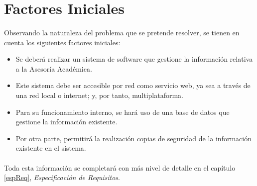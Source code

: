 \section{Factores Iniciales}

\paragraph{}Observando la naturaleza del problema que se pretende resolver, se
tienen en cuenta los siguientes factores iniciales:

\begin{itemize}
   \item Se deberá realizar un sistema de software que gestione la información
   relativa a la Asesoría Académica.
   \item Este sistema debe ser accesible por red como servicio web, ya sea a
   través de una red local o internet; y, por tanto, multiplataforma.
   \item Para su funcionamiento interno, se hará uso de una base de datos que
   gestione la información existente.
   \item Por otra parte, permitirá la realización copias de seguridad de la
   información existente en el sistema.
\end{itemize}

\paragraph{}Toda esta información se completará con más nivel de detalle en el
capítulo \ref{espReq}, \textit{Especificación de Requisitos}.
